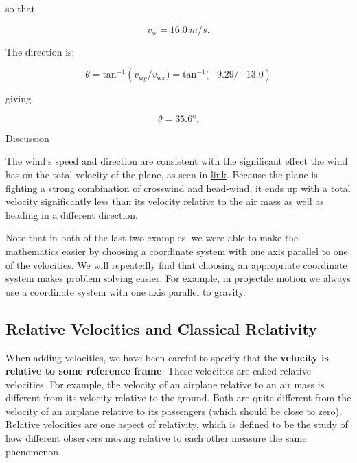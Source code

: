 \documentclass[
]{book}
\begin{document}
so that

\leavevmode{}%
\[{{v_{\text{w}} = \text{16}}\text{.}0\ m/s\text{.}}{}\]

The direction is:

\leavevmode{}%
\[{{\theta = \text{tan}^{- 1}}({v_{\text{w}y}/v_{\text{w}x}}{) = \text{tan}^{- 1}}{( - 9}\text{.}{\text{29}/{- \text{13}}}\text{.}0)}{}\]

giving

\leavevmode{}%
\[{{\theta = \text{35}}\text{.}6º}\text{.}{}\]

{Discussion}

The wind's speed and direction are consistent with the significant
effect the wind has on the total velocity of the plane, as seen in
\protect\hyperlink{import-auto-id1546060}{link}. Because the
plane is fighting a strong combination of crosswind and head-wind, it
ends up with a total velocity significantly less than its velocity
relative to the air mass as well as heading in a different direction.

Note that in both of the last two examples, we were able to make the
mathematics easier by choosing a coordinate system with one axis
parallel to one of the velocities. We will repeatedly find that choosing
an appropriate coordinate system makes problem solving easier. For
example, in projectile motion we always use a coordinate system with one
axis parallel to gravity.

\hypertarget{fs-id1969463}{}
\hypertarget{relative-velocities-and-classical-relativity}{%
\subsection{Relative Velocities and Classical Relativity}\label{relative-velocities-and-classical-relativity}}

When adding velocities, we have been careful to specify that the
\textbf{velocity is relative to some reference frame}. These velocities are
called \protect\hypertarget{import-auto-id1929302}{}{relative velocities}.
For example, the velocity of an airplane relative to an air mass is
different from its velocity relative to the ground. Both are quite
different from the velocity of an airplane relative to its passengers
(which should be close to zero). Relative velocities are one aspect of
\protect\hypertarget{import-auto-id1982113}{}{relativity}, which is defined
to be the study of how different observers moving relative to each other
measure the same phenomenon.
\end{document}
